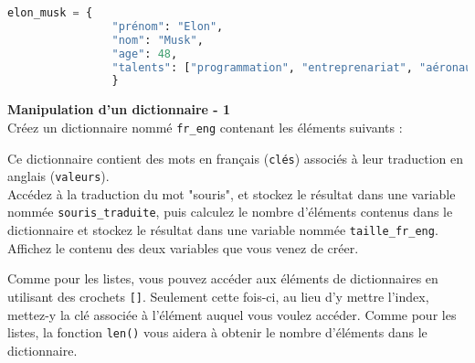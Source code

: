 	 \begin{lstlisting}[language=Python]
          elon_musk = {
                "prénom": "Elon",
                "nom": "Musk",
                "age": 48,
                "talents": ["programmation", "entreprenariat", "aéronautique"]
				}   \end{lstlisting}
				
	\begin{Exercice}[5 minutes] \textbf{Manipulation d'un dictionnaire - 1}\\
       Créez un dictionnaire nommé \lstinline{fr_eng} contenant les éléments suivants :
       
       
       
       Ce dictionnaire contient des mots en français (\lstinline{clés}) associés à leur traduction en anglais (\lstinline{valeurs}). \\
       
       Accédez à la traduction du mot "souris", et stockez le résultat dans une variable nommée \lstinline{souris_traduite}, puis calculez le nombre d'éléments contenus dans le dictionnaire et stockez le résultat dans une variable nommée \lstinline{taille_fr_eng}. Affichez le contenu des deux variables que vous venez de créer.
    
        \begin{conseil}
            Comme pour les listes, vous pouvez accéder aux éléments de dictionnaires en utilisant des crochets \lstinline{[]}. Seulement cette fois-ci, au lieu d'y mettre l'index, mettez-y la clé associée à l'élément auquel vous voulez accéder. Comme pour les listes, la fonction \lstinline{len()} vous aidera à obtenir le nombre d'éléments dans le dictionnaire.
        \end{conseil}
        
        \begin{solution}
             
        \end{solution}
    \end{Exercice}
    
